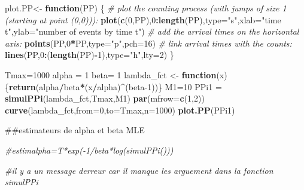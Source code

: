 \documentclass[
]{article}
\newenvironment{Shaded}{\begin{snugshade}}{\end{snugshade}}
\newcommand{\AttributeTok}[1]{\textcolor[rgb]{0.13,0.29,0.53}{#1}}
\newcommand{\CommentTok}[1]{\textcolor[rgb]{0.56,0.35,0.01}{\textit{#1}}}
\newcommand{\ControlFlowTok}[1]{\textcolor[rgb]{0.13,0.29,0.53}{\textbf{#1}}}
\newcommand{\DecValTok}[1]{\textcolor[rgb]{0.00,0.00,0.81}{#1}}
\newcommand{\FunctionTok}[1]{\textcolor[rgb]{0.13,0.29,0.53}{\textbf{#1}}}
\newcommand{\NormalTok}[1]{#1}
\newcommand{\OtherTok}[1]{\textcolor[rgb]{0.56,0.35,0.01}{#1}}
\newcommand{\SpecialCharTok}[1]{\textcolor[rgb]{0.81,0.36,0.00}{\textbf{#1}}}
\newcommand{\StringTok}[1]{\textcolor[rgb]{0.31,0.60,0.02}{#1}}
\begin{document}
\begin{Shaded}
\begin{Highlighting}[]
\NormalTok{plot.PP}\OtherTok{\textless{}{-}} \ControlFlowTok{function}\NormalTok{(PP)}
\NormalTok{\{}
  \CommentTok{\# plot the counting process (with jumps of size 1 (starting at point (0,0))):}
  \FunctionTok{plot}\NormalTok{(}\FunctionTok{c}\NormalTok{(}\DecValTok{0}\NormalTok{,PP),}\DecValTok{0}\SpecialCharTok{:}\FunctionTok{length}\NormalTok{(PP),}\AttributeTok{type=}\StringTok{"s"}\NormalTok{,}\AttributeTok{xlab=}\StringTok{"time t"}\NormalTok{,}\AttributeTok{ylab=}\StringTok{"number of events by time t"}\NormalTok{)}
  \CommentTok{\# add the arrival times on the horizontal axis: }
  \FunctionTok{points}\NormalTok{(PP,}\DecValTok{0}\SpecialCharTok{*}\NormalTok{PP,}\AttributeTok{type=}\StringTok{"p"}\NormalTok{,}\AttributeTok{pch=}\DecValTok{16}\NormalTok{)}
  \CommentTok{\# link arrival times with the counts:}
  \FunctionTok{lines}\NormalTok{(PP,}\DecValTok{0}\SpecialCharTok{:}\NormalTok{(}\FunctionTok{length}\NormalTok{(PP)}\SpecialCharTok{{-}}\DecValTok{1}\NormalTok{),}\AttributeTok{type=}\StringTok{"h"}\NormalTok{,}\AttributeTok{lty=}\DecValTok{2}\NormalTok{)}
\NormalTok{\}}
\end{Highlighting}
\end{Shaded}

\begin{Shaded}
\begin{Highlighting}[]
\NormalTok{Tmax}\OtherTok{=}\DecValTok{1000}
\NormalTok{alpha }\OtherTok{=} \DecValTok{1}
\NormalTok{beta}\OtherTok{=} \DecValTok{1}
\NormalTok{lambda\_fct }\OtherTok{\textless{}{-}} \ControlFlowTok{function}\NormalTok{(x)\{}\FunctionTok{return}\NormalTok{(alpha}\SpecialCharTok{/}\NormalTok{beta}\SpecialCharTok{*}\NormalTok{(x}\SpecialCharTok{/}\NormalTok{alpha)}\SpecialCharTok{\^{}}\NormalTok{(beta}\DecValTok{{-}1}\NormalTok{))\}}
\NormalTok{M1}\OtherTok{=}\DecValTok{10}
\NormalTok{PPi1 }\OtherTok{=} \FunctionTok{simulPPi}\NormalTok{(lambda\_fct,Tmax,M1)}
\FunctionTok{par}\NormalTok{(}\AttributeTok{mfrow=}\FunctionTok{c}\NormalTok{(}\DecValTok{1}\NormalTok{,}\DecValTok{2}\NormalTok{))}
\FunctionTok{curve}\NormalTok{(lambda\_fct,}\AttributeTok{from=}\DecValTok{0}\NormalTok{,}\AttributeTok{to=}\NormalTok{Tmax,}\AttributeTok{n=}\DecValTok{1000}\NormalTok{)}
\FunctionTok{plot.PP}\NormalTok{(PPi1)}
\end{Highlighting}
\end{Shaded}

\#\#estimateurs de alpha et beta MLE

\begin{Shaded}
\begin{Highlighting}[]
\CommentTok{\#estimalpha=T*exp({-}1/beta*log(simulPPi()))}

\CommentTok{\#il y a un message d\textquotesingle{}erreur car il manque les arguement dans la fonction simulPPi}
\end{Highlighting}
\end{Shaded}
\end{document}
